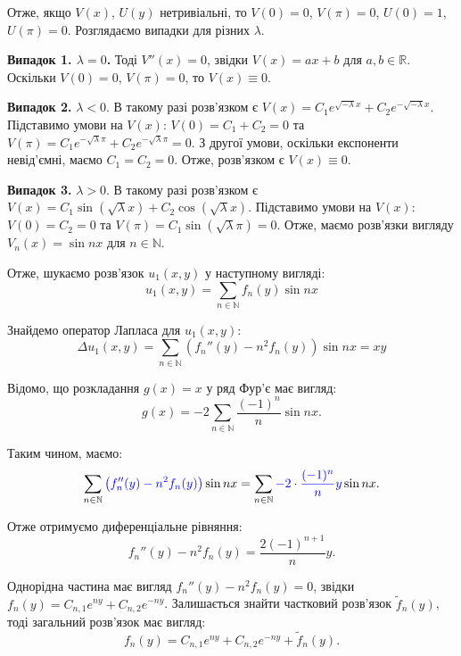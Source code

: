 \documentclass{hw_template}
\begin{document}
Отже, якщо $V(x)$, $U(y)$ нетривіальні, то $V(0)=0$, $V(\pi)=0$, $U(0)=1$, $U(\pi)=0$.
Розглядаємо випадки для різних $\lambda$.

\textbf{Випадок 1. $\lambda = 0$.} Тоді $V''(x) = 0$, звідки $V(x) = ax+b$ для $a,b \in \mathbb{R}$. 
Оскільки $V(0)=0$, $V(\pi)=0$, то $V(x) \equiv 0$.

\textbf{Випадок 2.} $\lambda < 0$. В такому разі розв'язком є $V(x) = C_1e^{\sqrt{-\lambda}x} + C_2e^{-\sqrt{-\lambda}x}$. 
Підставимо умови на $V(x)$: $V(0)=C_1+C_2=0$ та $V(\pi)=C_1e^{-\sqrt{\lambda}\pi} + C_2e^{-\sqrt{\lambda}\pi}=0$. З другої 
умови, оскільки експоненти невід'ємні, маємо $C_1=C_2=0$. Отже, розв'язком є $V(x) \equiv 0$.

\textbf{Випадок 3.} $\lambda > 0$. В такому разі розв'язком є $V(x) = C_1\sin(\sqrt{\lambda}x) + C_2\cos(\sqrt{\lambda}x)$.
Підставимо умови на $V(x)$: $V(0)=C_2=0$ та $V(\pi)=C_1\sin(\sqrt{\lambda}\pi)=0$. Отже, маємо розв'язки 
вигляду $V_n(x) = \sin nx$ для $n \in \mathbb{N}$.

Отже, шукаємо розв'язок $u_1(x,y)$ у наступному вигляді:
\begin{equation*}
    u_1(x,y) = \sum_{n \in \mathbb{N}}  f_n(y)\sin nx
\end{equation*}

Знайдемо оператор Лапласа для $u_1(x,y)$:
\begin{equation*}
    \Delta u_1(x,y) = \sum_{n \in \mathbb{N}} \left( f_n''(y) - n^2f_n(y) \right)\sin nx = xy
\end{equation*}

Відомо, що розкладання $g(x)=x$ у ряд Фур'є має вигляд:
\begin{equation*}
    g(x) = -2\sum_{n \in \mathbb{N}} \frac{(-1)^n}{n} \sin nx.
\end{equation*}

Таким чином, маємо:
\begin{equation*}
    \sum_{n \in \mathbb{N}} \textcolor{blue}{\left( f_n''(y) - n^2f_n(y) \right)}\sin nx = \sum_{n \in \mathbb{N}} \textcolor{blue}{-2 \cdot \frac{(-1)^n}{n} y}\sin nx.
\end{equation*}

Отже отримуємо диференціальне рівняння:
\begin{equation*}
    f_n''(y) - n^2f_n(y) = \frac{2(-1)^{n+1}}{n} y.
\end{equation*}

Однорідна частина має вигляд $f_n''(y)-n^2f_n(y) = 0$, звідки $f_n(y) = C_{n,1}e^{ny} + C_{n,2}e^{-ny}$. 
Залишається знайти частковий розв'язок $\widetilde{f}_n(y)$, тоді загальний розв'язок має вигляд:
\begin{equation*}
    f_n(y) = C_{n,1}e^{ny} + C_{n,2}e^{-ny} + \widetilde{f}_n(y).
\end{equation*}
\end{document}
